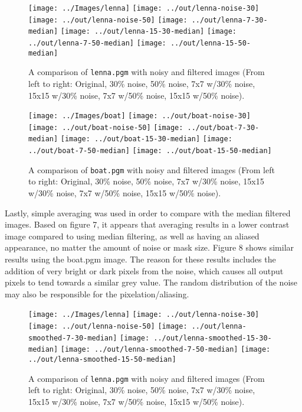 \documentclass[headings=optiontoheadandtoc,listof=totoc,parskip=full]{scrartcl}
\begin{document}
\begin{figure}[ht]
	\centering
	\texttt{[image: ../Images/lenna]}
	\texttt{[image: ../out/lenna-noise-30]}
	\texttt{[image: ../out/lenna-noise-50]}
	\texttt{[image: ../out/lenna-7-30-median]}
	\texttt{[image: ../out/lenna-15-30-median]}
	\texttt{[image: ../out/lenna-7-50-median]}
	\texttt{[image: ../out/lenna-15-50-median]}
	\caption{A comparison of \texttt{lenna.pgm} with noisy and filtered images (From left to right: Original, 30\% noise, 50\% noise, 7x7 w/30\% noise, 15x15 w/30\% noise, 7x7 w/50\% noise, 15x15 w/50\% noise).}
	\label{fig:median-result-1}
\end{figure}


\begin{figure}[ht]
	\centering
	\texttt{[image: ../Images/boat]}
	\texttt{[image: ../out/boat-noise-30]}
	\texttt{[image: ../out/boat-noise-50]}
	\texttt{[image: ../out/boat-7-30-median]}
	\texttt{[image: ../out/boat-15-30-median]}
	\texttt{[image: ../out/boat-7-50-median]}
	\texttt{[image: ../out/boat-15-50-median]}
	\caption{A comparison of \texttt{boat.pgm} with noisy and filtered images (From left to right: Original, 30\% noise, 50\% noise, 7x7 w/30\% noise, 15x15 w/30\% noise, 7x7 w/50\% noise, 15x15 w/50\% noise).}
	\label{fig:median-result-2}
\end{figure}

Lastly, simple averaging was used in order to compare with the median filtered images. Based on figure 7, it appears that averaging results in a lower contrast image compared to using median filtering, as well as having an aliased appearance, no matter the amount of noise or mask size. Figure 8 shows similar results using the boat.pgm image. The reason for these results includes the addition of very bright or dark pixels from the noise, which causes all output pixels to tend towards a similar grey value. The random distribution of the noise may also be responsible for the pixelation/aliasing. 

\begin{figure}[ht]
	\centering
	\texttt{[image: ../Images/lenna]}
	\texttt{[image: ../out/lenna-noise-30]}
	\texttt{[image: ../out/lenna-noise-50]}
	\texttt{[image: ../out/lenna-smoothed-7-30-median]}
	\texttt{[image: ../out/lenna-smoothed-15-30-median]}
	\texttt{[image: ../out/lenna-smoothed-7-50-median]}
	\texttt{[image: ../out/lenna-smoothed-15-50-median]}
	\caption{A comparison of \texttt{lenna.pgm} with noisy and filtered images (From left to right: Original, 30\% noise, 50\% noise, 7x7 w/30\% noise, 15x15 w/30\% noise, 7x7 w/50\% noise, 15x15 w/50\% noise).}
	\label{fig:median-result-3}
\end{figure}
\end{document}
